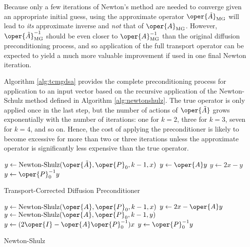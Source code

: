 Because only a few iterations of Newton's method are needed to 
converge given an appropriate initial guess, using the approximate 
operator $\oper{\tilde{A}}_{\text{MG}}$ will lead to \emph{ its} approximate
inverse and \emph{ not} that of $\oper{{A}}_{\text{MG}}$.
However, $\oper{\tilde{A}}^{-1}_{\text{MG}}$ should be even 
closer to $ \oper{A}^{-1}_{\text{MG}}$ than the original diffusion 
preconditioning process, and so application of the full transport operator 
can be expected to yield a much more valuable improvement if used in one 
final Newton iteration.  

Algorithm \ref{alg:tcmgdsa} provides the 
complete preconditioning process for application to an input 
vector based on the recursive application of the Newton-Schulz method
defined in Algorithm \ref{alg:newtonshulz}.  
The true operator is only applied once in the last step, but the number of 
actions of $\oper{\tilde{A}}$ grows exponentially with the number 
of iterations: one for $k=2$, three for $k=3$, seven for $k=4$, and 
so on.  
Hence, the cost of applying the preconditioner is likely to 
become excessive for more than two or three iterations unless the 
approximate operator is significantly less expensive than the 
true operator.

\begin{algorithm}[ht]
  \DontPrintSemicolon
  $y \gets \text{Newton-Shulz}(\oper{\tilde{A}}, \oper{P}_0, k-1, x)$ \;
  $y \gets \oper{A}y$ \;
  $y \gets 2x - y$ \;
  $y \gets \oper{P}^{-1}_0 y$ \;
  \caption{Transport-Corrected Diffusion Preconditioner}
  \label{alg:tcmgdsa}
\end{algorithm}

\begin{algorithm}[ht]
  \DontPrintSemicolon
  {
    $y \gets \text{Newton-Shulz}(\oper{A}, \oper{P}_0, k - 1, x)$ \;
    $y \gets 2x- \oper{A}y$\;
    $y \gets \text{Newton-Shulz}(\oper{A}, \oper{P}_0, k - 1, y)$ \; 
  }
  \Else
  {
    $y \gets (2\oper{I}-\oper{A} \oper{P}^{-1}_0) x$ \;
    $y \gets \oper{P}^{-1}_0 y$ \;
  }
  \caption{Newton-Shulz}
  \label{alg:newtonshulz}
\end{algorithm}

